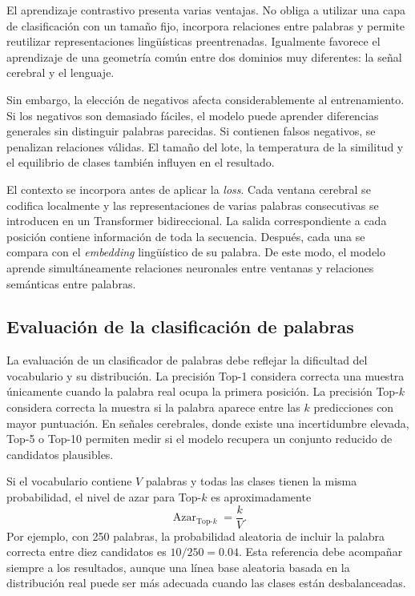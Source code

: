 El aprendizaje contrastivo presenta varias ventajas. No obliga a utilizar una capa de clasificación con un tamaño fijo, incorpora relaciones entre palabras y permite reutilizar representaciones lingüísticas preentrenadas. Igualmente favorece el aprendizaje de una geometría común entre dos dominios muy diferentes: la señal cerebral y el lenguaje.

Sin embargo, la elección de negativos afecta considerablemente al entrenamiento. Si los negativos son demasiado fáciles, el modelo puede aprender diferencias generales sin distinguir palabras parecidas. Si contienen falsos negativos, se penalizan relaciones válidas. El tamaño del lote, la temperatura de la similitud y el equilibrio de clases también influyen en el resultado.

El contexto se incorpora antes de aplicar la \textit{loss}. Cada ventana cerebral se codifica localmente y las representaciones de varias palabras consecutivas se introducen en un Transformer bidireccional. La salida correspondiente a cada posición contiene información de toda la secuencia. Después, cada una se compara con el \textit{embedding} lingüístico de su palabra. De este modo, el modelo aprende simultáneamente relaciones neuronales entre ventanas y relaciones semánticas entre palabras.

\subsection{Evaluación de la clasificación de palabras}

La evaluación de un clasificador de palabras debe reflejar la dificultad del vocabulario y su distribución. La precisión Top-1 considera correcta una muestra únicamente cuando la palabra real ocupa la primera posición. La precisión Top-\(k\) considera correcta la muestra si la palabra aparece entre las \(k\) predicciones con mayor puntuación. En señales cerebrales, donde existe una incertidumbre elevada, Top-5 o Top-10 permiten medir si el modelo recupera un conjunto reducido de candidatos plausibles.

Si el vocabulario contiene \(V\) palabras y todas las clases tienen la misma probabilidad, el nivel de azar para Top-\(k\) es aproximadamente
\[
    \operatorname{Azar}_{\text{Top-}k} = \frac{k}{V}.
\]
Por ejemplo, con 250 palabras, la probabilidad aleatoria de incluir la palabra correcta entre diez candidatos es \(10/250=0.04\). Esta referencia debe acompañar siempre a los resultados, aunque una línea base aleatoria basada en la distribución real puede ser más adecuada cuando las clases están desbalanceadas.

